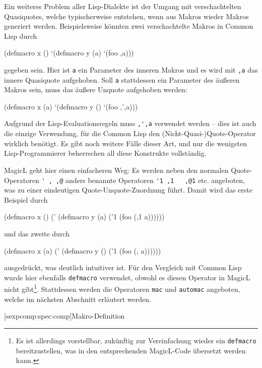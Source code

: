 \documentclass[12pt, a4paper, bibgerm]{scrbook}
\newcommand\icode[1]{\lstinline?#1?}
\newcommand\lsubsection{}
\begin{document}
Ein weiteres Problem aller Lisp-Dialekte ist der Umgang mit
verschachtelten Quasiquotes, welche typischerweise entstehen, wenn aus
Makros wieder Makros generiert werden. Beispielsweise könnten zwei
verschachtelte Makros in Common Lisp durch
\begin{code}
(defmacro x ()
  `(defmacro y (a)
      `(foo ,a)))
\end{code}
gegeben sein. Hier ist \icode{a} ein Parameter des inneren Makros und es
wird mit \icode{,a} das innere Quasiquote aufgehoben. Soll \icode{a}
stattdessen ein Parameter des äußeren Makros sein, muss das äußere
Unquote aufgehoben werden:
\begin{code}
(defmacro x (a)
  `(defmacro y ()
      `(foo ,',a)))
\end{code}
Aufgrund der Lisp-Evaluationsregeln muss \icode{,',a} verwendet werden
-- dies ist auch die einzige Verwendung, für die Common Lisp den
(Nicht-Quasi-)Quote-Operator wirklich benötigt. Es gibt noch weitere
Fälle dieser Art, und nur die wenigsten Lisp-Programmierer beherrschen
all diese Konstrukte vollständig.

MagicL geht hier einen einfacheren Weg: Es werden neben den normalen
Quote-Operatoren \icode{' , ,@} anders benannte Operatoren \icode{'1 ,1
  ,@1} etc. angeboten, was zu einer eindeutigen Quote-Unquote-Zuordnung
führt. Damit wird das erste Beispiel durch
\begin{code}
(defmacro x ()
  (' (defmacro y (a)
       ('1 (foo (,1 a))))))
\end{code}
und das zweite durch
\begin{code}
(defmacro x (a)
  (' (defmacro y ()
       ('1 (foo (, a))))))
\end{code}
ausgedrückt, was deutlich intuitiver ist. Für den Vergleich mit Common
Lisp wurde hier ebenfalls \icode{defmacro} verwendet, obwohl es 
diesen Operator in MagicL nicht gibt\footnote{Es ist allerdings vorstellbar,
  zukünftig zur Vereinfachung wieder ein \icode{defmacro}
  bereitzustellen, was in den entsprechenden MagicL-Code übersetzt
  werden kann.}. Stattdessen werden die Operatoren \icode{mac} und
\icode{automac} angeboten, welche im nächsten Abschnitt erläutert
werden.

\lsubsection[sexpcomp:spec:comp]{Makro-Definition}
\end{document}
